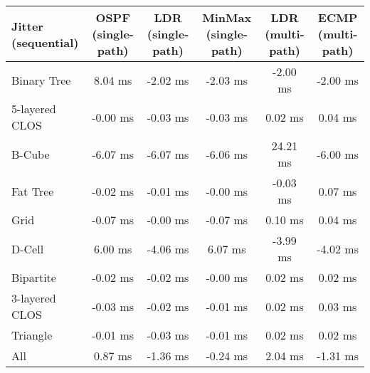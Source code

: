 \begin{tabular}{l|ccccc}
Jitter (sequential) & OSPF (single-path) & LDR (single-path) & MinMax (single-path) & LDR (multi-path) & ECMP (multi-path) \\
\hline
Binary Tree         & 8.04 ms            & -2.02 ms          & -2.03 ms             & -2.00 ms         & -2.00 ms          \\
5-layered CLOS      & -0.00 ms           & -0.03 ms          & -0.03 ms             & 0.02 ms          & 0.04 ms           \\
B-Cube              & -6.07 ms           & -6.07 ms          & -6.06 ms             & 24.21 ms         & -6.00 ms          \\
Fat Tree            & -0.02 ms           & -0.01 ms          & -0.00 ms             & -0.03 ms         & 0.07 ms           \\
Grid                & -0.07 ms           & -0.00 ms          & -0.07 ms             & 0.10 ms          & 0.04 ms           \\
D-Cell              & 6.00 ms            & -4.06 ms          & 6.07 ms              & -3.99 ms         & -4.02 ms          \\
Bipartite           & -0.02 ms           & -0.02 ms          & -0.00 ms             & 0.02 ms          & 0.02 ms           \\
3-layered CLOS      & -0.03 ms           & -0.02 ms          & -0.01 ms             & 0.02 ms          & 0.03 ms           \\
Triangle            & -0.01 ms           & -0.03 ms          & -0.01 ms             & 0.02 ms          & 0.02 ms           \\
All                 & 0.87 ms            & -1.36 ms          & -0.24 ms             & 2.04 ms          & -1.31 ms          \\
\end{tabular}